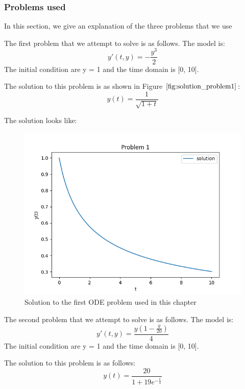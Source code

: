 \documentclass{article}
\begin{document}
\subsubsection{Problems used}
\label{section:defect_problem_used}
In this section, we give an explanation of the three problems that we use 

The first problem that we attempt to solve is as follows.
The model is:
\begin{equation}
y'(t, y) = - \frac{y^{3}}{2} 
\end{equation}
The initial condition are y = 1 and the time domain is [0, 10].

The solution to this problem is as shown in Figure $\ref{fig:solution_problem1}$:
\begin{equation}
y(t) = \frac
{1}
{\sqrt{1 + t}}
\end{equation}

The solution looks like:
\begin{figure}[H]
\centering
\includegraphics[width=0.7\linewidth]{./figures/solution_problem1}
\caption{Solution to the first ODE problem used in this chapter}
\label{fig:solution_problem1}
\end{figure}

The second problem that we attempt to solve is as follows.
The model is:
\begin{equation}
y'(t, y) = \frac{y(1 - \frac{y}{20})}
{4} 
\end{equation}
The initial condition are y = 1 and the time domain is [0, 10].

The solution to this problem is as follows:
\begin{equation}
y(t) = \frac{20}{1 + 19e^{-\frac{t}{4}}}
\end{equation}
\end{document}
